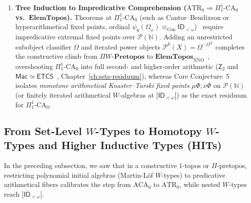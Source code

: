 \begin{enumerate}
\[
  \begin{aligned}
    \mathrm{ACA}_0 + \bigl(\text{Arithmetical-Fiber Initial } &W\text{-Algebras for } P_f\bigr) \\
    &\iff \mathrm{ATR}_0 \quad (\text{Core Conj.~5}).
  \end{aligned}
\]

Extending a constructive $\Pi$-pretopos by unrestricted nested $W$-types ascends to $|\mathsf{ID}_{<\omega}|$ (surpassing $|\mathsf{CZF}| = |\mathsf{KP}\omega|$) without impredicative power sets.

  \item \textbf{Tree Induction to Impredicative Comprehension ($\mathrm{ATR}_0 \Rightarrow \Pi^1_1\text{-}\mathrm{CA}_0$ vs.\ $\mathbf{ElemTopos}$).} Theorems at $\Pi^1_1\text{-}\mathrm{CA}_0$ (such as Cantor--Bendixson or hyperarithmetical fixed points, ordinal $\psi_0(\Omega_\omega) \equiv_{\mathrm{Con}} \mathsf{ID}_{<\omega}$)~\cite{Friedman75,Simpson09} require impredicative extremal fixed points over $\mathcal{P}(\mathbb{N})$. Adding an unrestricted subobject classifier $\Omega$ and iterated power objects $\mathcal{P}^k(X) = \Omega^{\cdots\Omega^X}$ completes the constructive climb from $\Pi W\text{-}\mathbf{Pretopos}$ to $\mathbf{ElemTopos}_{\mathrm{NNO}}$~\cite{Maietti05}, overshooting $\Pi^1_1\text{-}\mathrm{CA}_0$ into full second- and higher-order arithmetic ($\mathsf{Z}_2$ and $\mathsf{Mac} \simeq \mathsf{ETCS}$~\cite{Cole73}, Chapter~\ref{ch:sets-residuum}), whereas Core Conjecture~5 isolates \emph{monotone arithmetical Knaster--Tarski fixed points} $\mu\Phi, \nu\Phi$ on $\mathcal{P}(\mathbb{N})$ (or finitely iterated arithmetical $W$-algebras at $|\mathsf{ID}_{<\omega}|$) as the exact residuum for $\Pi^1_1\text{-}\mathrm{CA}_0$.

\end{enumerate}

\subsection{From Set-Level $W$-Types to Homotopy $W$-Types and Higher Inductive Types (HITs)}

In the preceding subsection, we saw that in a constructive $1$-topos or $\Pi$-pretopos, restricting polynomial initial algebras (Martin-L\"of $W$-types) to predicative arithmetical fibers calibrates the step from $\mathrm{ACA}_0$ to $\mathrm{ATR}_0$, while nested $W$-types reach $|\mathsf{ID}_{<\omega}|$.

